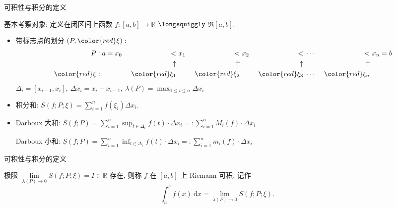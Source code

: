 
\begin{frame}{可积性与积分的定义}

基本考察对象: 定义在闭区间上函数 $f: [a, b] \longrightarrow \mathbb{R}$
\pause
$\longsquiggly$ $\mathfrak{R}[a,b].$

\pause

\begin{itemize}[<+->]
\item {\color{red}带标志点的}划分 $(P, {\color{red}\xi}):$
\begin{alignat*}{8}
P & : a = x_0 & < & ~ x_1 & < & ~ x_2 & ~ < & ~ \cdots & ~ < & ~ x_n = b \\
& & \uparrow & & \uparrow & & \uparrow & & \uparrow & \\
{\color{red}\xi} & : & ~ {\color{red}\xi_1} & & ~ {\color{red}\xi_2} & & ~ {\color{red}\xi_3} & ~ \cdots & ~ {\color{red}\xi_n} &
\end{alignat*}
$\Delta_i = [x_{i-1}, x_i], ~ \Delta x_i = x_i - x_{i-1}, ~ \lambda(P) = \max_{1 \leqslant i \leqslant n} \Delta x_i$
\item 积分和: $S(f; P; \xi) = \sum\limits_{i=1}^n f(\xi_i) \Delta x_i.$
\item Darboux 大和: $\overline{S}(f; P) = \sum\limits_{i=1}^n \sup_{t\in\Delta_i} f(t) \cdot \Delta x_i =: \sum\limits_{i=1}^n M_i(f) \cdot \Delta x_i$ \par
Darboux 小和: $\underline{S}(f; P) = \sum\limits_{i=1}^n \inf_{t\in\Delta_i} f(t) \cdot \Delta x_i =: \sum\limits_{i=1}^n m_i(f) \cdot \Delta x_i$
\end{itemize}

\end{frame}


\begin{frame}{可积性与积分的定义}

\begin{Def}[函数 Riemann 可积]
极限 $\lim\limits_{\lambda(P) \to 0} S(f; P; \xi) = I \in \mathbb{R}$ 存在, 则称 $f$ 在 $[a, b]$ 上 Riemann 可积, 记作
\[\int_a^b f(x) ~ \mathrm{d} x = \lim\limits_{\lambda(P) \to 0} S(f; P; \xi).\]
\end{Def}

\end{frame}


